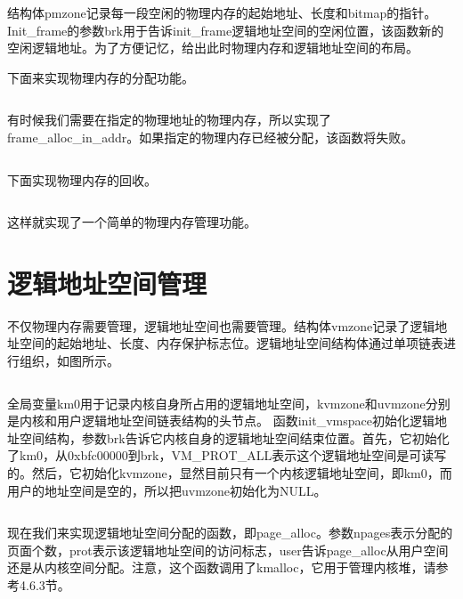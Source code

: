 \documentclass[main.tex]{subfiles}
\begin{document}
\begin{CJK*}{UTF8}{song}
结构体pmzone记录每一段空闲的物理内存的起始地址、长度和bitmap的指针。Init\_frame的参数brk用于告诉init\_frame逻辑地址空间的空闲位置，该函数新的空闲逻辑地址。为了方便记忆，给出此时物理内存和逻辑地址空间的布局。

下面来实现物理内存的分配功能。

\inputminted[firstline=86,lastline=109,linenos,numbersep=5pt,frame=lines,framesep=2mm]{c}{chapter04/kernel/frame.c}

有时候我们需要在指定的物理地址的物理内存，所以实现了frame\_alloc\_in\_addr。如果指定的物理内存已经被分配，该函数将失败。

\inputminted[firstline=60,lastline=84,linenos,numbersep=5pt,frame=lines,framesep=2mm]{c}{chapter04/kernel/frame.c}

下面实现物理内存的回收。

\inputminted[firstline=111,lastline=137,linenos,numbersep=5pt,frame=lines,framesep=2mm]{c}{chapter04/kernel/frame.c}

这样就实现了一个简单的物理内存管理功能。

\section{逻辑地址空间管理}
不仅物理内存需要管理，逻辑地址空间也需要管理。结构体vmzone记录了逻辑地址空间的起始地址、长度、内存保护标志位。逻辑地址空间结构体通过单项链表进行组织，如图所示。

\inputminted[firstline=24,lastline=36,linenos,numbersep=5pt,frame=lines,framesep=2mm]{c}{chapter04/kernel/page.c}

全局变量km0用于记录内核自身所占用的逻辑地址空间，kvmzone和uvmzone分别是内核和用户逻辑地址空间链表结构的头节点。
函数init\_vmspace初始化逻辑地址空间结构，参数brk告诉它内核自身的逻辑地址空间结束位置。首先，它初始化了km0，从0xbfc00000到brk，VM\_PROT\_ALL表示这个逻辑地址空间是可读写的。然后，它初始化kvmzone，显然目前只有一个内核逻辑地址空间，即km0，而用户的地址空间是空的，所以把uvmzone初始化为NULL。

\inputminted[firstline=38,lastline=47,linenos,numbersep=5pt,frame=lines,framesep=2mm]{c}{chapter04/kernel/page.c}

现在我们来实现逻辑地址空间分配的函数，即page\_alloc。参数npages表示分配的页面个数，prot表示该逻辑地址空间的访问标志，user告诉page\_alloc从用户空间还是从内核空间分配。注意，这个函数调用了kmalloc，它用于管理内核堆，请参考4.6.3节。

\inputminted[firstline=112,lastline=174,linenos,numbersep=5pt,frame=lines,framesep=2mm]{c}{chapter04/kernel/page.c}


\end{CJK*}
\end{document}
